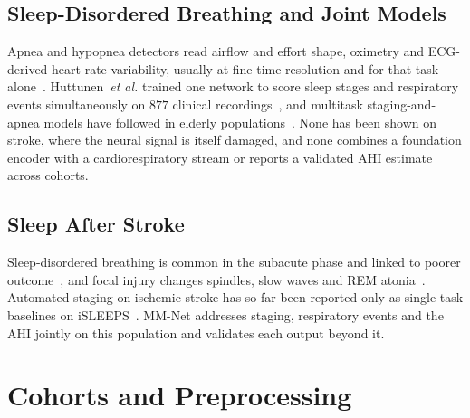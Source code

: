 \documentclass{ieeeaccess}
\begin{document}
\subsection{Sleep-Disordered Breathing and Joint Models}
Apnea and hypopnea detectors read airflow and effort shape, oximetry and ECG-derived heart-rate
variability, usually at fine time resolution and for that task alone~\cite{aasm2023manual}.
Huttunen~\textit{et al.} trained one network to score sleep stages and respiratory events
simultaneously on $877$ clinical recordings~\cite{huttunen2023simultaneous}, and multitask
staging-and-apnea models have followed in elderly populations~\cite{multitask2025elderly}. None
has been shown on stroke, where the neural signal is itself damaged, and none combines a
foundation encoder with a cardiorespiratory stream or reports a validated AHI estimate across
cohorts.

\subsection{Sleep After Stroke}
Sleep-disordered breathing is common in the subacute phase and linked to poorer
outcome~\cite{bassetti2006sleep,denis2024sleep,tellenbach2023brainstem}, and focal injury
changes spindles, slow waves and REM
atonia~\cite{gottselig2002stroke,fernandez2019spindles,simpson2023laterality,facchin2020slowwaves,zheng2025spindles,anastasi2017bsi}.
Automated staging on ischemic stroke has so far been reported only as single-task baselines on
iSLEEPS~\cite{maiti2026isleeps,bose2026gap}. MM-Net addresses staging, respiratory events and the
AHI jointly on this population and validates each output beyond it.

\section{Cohorts and Preprocessing}
\label{sec:data}
\end{document}
